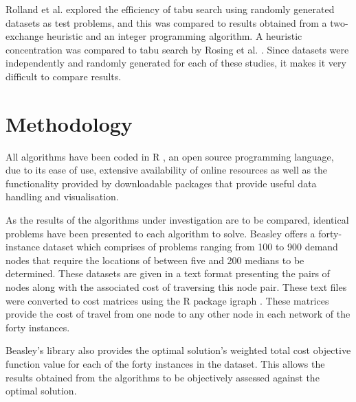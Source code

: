 \documentclass[11pt]{article}
\begin{document}
	Rolland et al. \cite{ROLL97} explored the efficiency of tabu search using randomly generated datasets as test problems, and this was compared to results obtained from a two-exchange heuristic and an integer programming algorithm.  A heuristic concentration was compared to tabu search by Rosing et al. \cite{ROSI98}.  Since datasets were independently and randomly generated for each of these studies, it makes it very difficult to compare results.
	
	
	\section{Methodology} \label{methodology}
	All algorithms have been coded in R \cite{RPROGRAMME}, an open source programming language, due to its ease of use, extensive availability of online resources as well as the functionality provided by downloadable packages that provide useful data handling and visualisation.
	
	As the results of the algorithms under investigation are to be compared, identical problems have been presented to each algorithm to solve.  Beasley \cite{BEAS90}  offers a forty-instance dataset which comprises of problems ranging from 100 to 900 demand nodes that require the locations of between five and 200 medians to be determined.  These datasets are given in a text format presenting the pairs of nodes along with the associated cost of traversing this node pair.  These text files were converted to cost matrices using the R package igraph \cite{RIGRAPH}.  These matrices provide the cost of travel from one node to any other node in each network of the forty instances.
	
	Beasley's library also provides the optimal solution's weighted total cost objective function value for each of the forty instances in the dataset.  This allows the results obtained from the algorithms to be objectively assessed against the optimal solution.  
	
\end{document}
